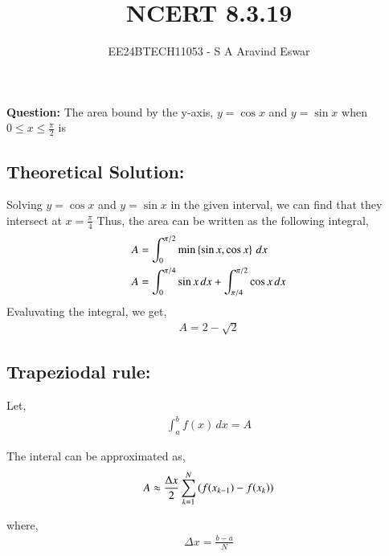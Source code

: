 \documentclass[journal]{IEEEtran}
\begin{document}

\vspace{3cm}

\title{NCERT 8.3.19}
\author{EE24BTECH11053 - S A Aravind Eswar}
{\let\newpage\relax\maketitle}

\renewcommand{\thefigure}{\theenumi}
\renewcommand{\thetable}{\theenumi}
\setlength{\intextsep}{10pt} %

\textbf{Question:} The area bound by the y-axis, $y=\cos{x}$ and $y=\sin{x}$ when $\displaystyle 0\leq x \leq \frac{\pi}{2}$ is

\subsection{Theoretical Solution:}
    Solving $y=\cos{x}$ and $y = \sin{x}$ in the given interval, we can find that they intersect at $x = \frac{\pi}{4}$
    Thus, the area can be written as the following integral,
    \begin{align}
        A &= \int_{0}^{\pi/2} \min\left\{\sin{x}, \cos{x}\right\}\, dx\\
        A &= \int_{0}^{\pi/4} \sin{x}\,dx + \int_{\pi/4}^{\pi/2} \cos{x}\,dx
    \end{align}
    Evaluvating the integral, we get,
    \begin{align}
        A = 2 - \sqrt{2}
    \end{align}

\subsection{Trapeziodal rule:}
    Let,
    \begin{align}
        \int_{a}^{b} f(x) \,dx = A
    \end{align}

    The interal can be approximated as,
    \begin{align}
        A \approx \frac{\Delta x}{2} \sum_{k=1}^{N} \left(f(x_{k-1}) - f(x_k)\right)
    \end{align}

    where,
    \begin{align}
        \Delta x = \frac{b-a}{N}
    \end{align}
\end{document}
